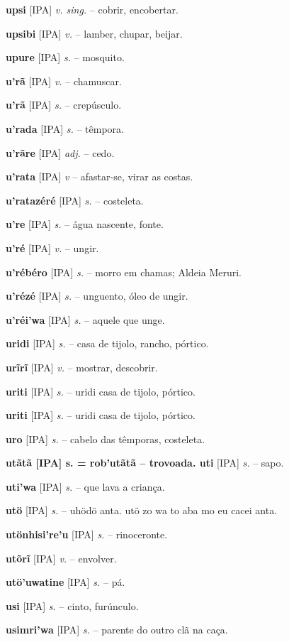 \textbf{upsi} [IPA] \textit{v. sing.} -- cobrir, encobertar.

\textbf{upsibi} [IPA] \textit{v.} -- lamber, chupar, beijar.

\textbf{upure} [IPA] \textit{s.} -- mosquito.

\textbf{u'rã} [IPA] \textit{v.} -- chamuscar.

\textbf{u'rã} [IPA] \textit{s.} -- crepúsculo.

\textbf{u'rada} [IPA] \textit{s.} -- têmpora.

\textbf{u'rãre} [IPA] \textit{adj.} -- cedo.

\textbf{u'rata} [IPA] \textit{v} -- afastar-se, virar as costas.

\textbf{u'ratazéré} [IPA] \textit{s.} -- costeleta.

\textbf{u're} [IPA] \textit{s.} -- água nascente, fonte.

\textbf{u'ré} [IPA] \textit{v.} -- ungir.

\textbf{u'rébéro} [IPA] \textit{s.} -- morro em chamas; Aldeia Meruri.

\textbf{u'rézé} [IPA] \textit{s.} -- unguento, óleo de ungir.

\textbf{u'réi'wa} [IPA] \textit{s.} -- aquele que unge.

\textbf{uridi} [IPA] \textit{s.} -- casa de tijolo, rancho, pórtico.

\textbf{urĩrĩ} [IPA] \textit{v.} -- mostrar, descobrir.

\textbf{uriti} [IPA] \textit{s.} -- uridi casa de tijolo, pórtico.

\textbf{uriti} [IPA] \textit{s.} -- uridi casa de tijolo, pórtico.

\textbf{uro} [IPA] \textit{s.} -- cabelo das têmporas, costeleta.

\textbf{utãtã [IPA] s. = rob'utãtã -- trovoada. uti} [IPA] \textit{s.} -- sapo.

\textbf{uti'wa} [IPA] \textit{s.} -- que lava a criança.

\textbf{utö} [IPA] \textit{s.} -- uhödö anta. utö zo wa to aba mo eu cacei anta.

\textbf{utönhisi're'u} [IPA] \textit{s.} -- rinoceronte.

\textbf{utõrĩ} [IPA] \textit{v.} -- envolver.

\textbf{utö'uwatine} [IPA] \textit{s.} -- pá.

\textbf{usi} [IPA] \textit{s.} -- cinto, furúnculo.

\textbf{usimri'wa} [IPA] \textit{s.} -- parente do outro clã na caça.

